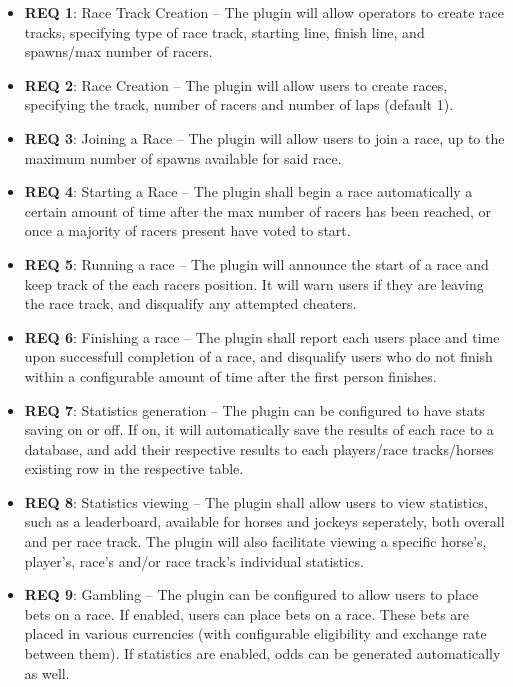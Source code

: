 \documentclass[a4paper, 11pt]{article} %
\begin{document}
\begin{itemize}
	\item \textbf{REQ 1}: Race Track Creation -- The plugin will allow operators to create race tracks, specifying type of race track, starting line, finish line, and spawns/max number of racers.
	\item \textbf{REQ 2}: Race Creation -- The plugin will allow users to create races, specifying the track, number of racers and number of laps (default 1).
	\item \textbf{REQ 3}: Joining a Race -- The plugin will allow users to join a race, up to the maximum number of spawns available for said race.
	\item \textbf{REQ 4}: Starting a Race -- The plugin shall begin a race automatically a certain amount of time after the max number of racers has been reached, or once a majority of racers present have voted to start.
	\item \textbf{REQ 5}: Running a race -- The plugin will announce the start of a race and keep track of the each racers position. It will warn users if they are leaving the race track, and disqualify any attempted cheaters.
	\item \textbf{REQ 6}: Finishing a race -- The plugin shall report each users place and time upon successfull completion of a race, and disqualify users who do not finish within a configurable amount of time after the first person finishes.
	\item \textbf{REQ 7}: Statistics generation -- The plugin can be configured to have stats saving on or off. If on, it will automatically save the results of each race to a database, and add their respective results to each players/race tracks/horses existing row in the respective table.
	\item \textbf{REQ 8}: Statistics viewing -- The plugin shall allow users to view statistics, such as a leaderboard, available for horses and jockeys seperately, both overall and per race track. The plugin will also facilitate viewing a specific horse's, player's, race's and/or race track's individual statistics.
	\item \textbf{REQ 9}: Gambling -- The plugin can be configured to allow users to place bets on a race. If enabled, users can place bets on a race. These bets are placed in various currencies (with configurable eligibility and exchange rate between them). If statistics are enabled, odds can be generated automatically as well.
\end{itemize}
\end{document}
